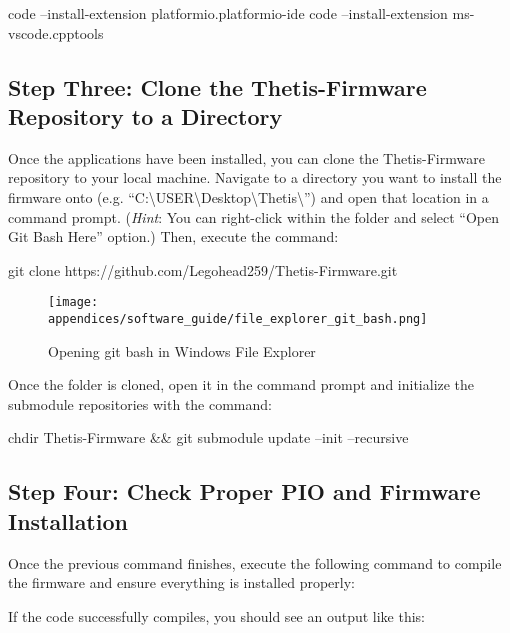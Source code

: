 \begin{bash}
    code --install-extension platformio.platformio-ide
    code --install-extension ms-vscode.cpptools
\end{bash}

\subsection{Step Three: Clone the Thetis-Firmware Repository to a Directory}
Once the applications have been installed, you can clone the Thetis-Firmware repository \cite{Thetis-Firmware} to your local machine.
Navigate to a directory you want to install the firmware onto (e.g. ``C:\textbackslash USER\textbackslash Desktop\textbackslash Thetis\textbackslash'') and open that location in a command prompt.
(\textit{Hint}: You can right-click within the folder and select ``Open Git Bash Here'' option.)
Then, execute the command:

\begin{bash}
    git clone https://github.com/Legohead259/Thetis-Firmware.git
\end{bash}

\begin{figure}[h!]
    \centering
    \texttt{[image: appendices/software\_guide/file\_explorer\_git\_bash.png]}
    \caption{Opening git bash in Windows File Explorer}
\end{figure}

Once the folder is cloned, open it in the command prompt and initialize the submodule repositories with the command:

\begin{bash}
    chdir Thetis-Firmware && git submodule update --init --recursive
\end{bash}

\subsection{Step Four: Check Proper PIO and Firmware Installation}
Once the previous command finishes, execute the following command to compile the firmware and ensure everything is installed properly:

\begin{bash}
\end{bash}

If the code successfully compiles, you should see an output like this:

